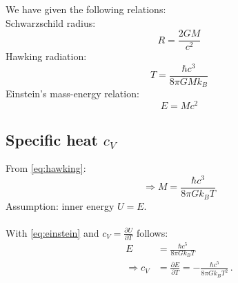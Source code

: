 We have given the following relations: \\
Schwarzschild radius:
\begin{equation}
    R=\frac{2GM}{c^2}
    \label{eq:schwarzschild}
\end{equation}
Hawking radiation:
\begin{equation}
    T=\frac{\hbar c^3}{8\pi GMk_B}
    \label{eq:hawking}
\end{equation}
Einstein's mass-energy relation:
\begin{equation}
    E=Mc^2
    \label{eq:einstein}
\end{equation}

\subsection{Specific heat $c_V$}
    From \eqref{eq:hawking}:
    \begin{equation}
        \Rightarrow M=\frac{\hbar c^3}{8\pi Gk_BT}
    \end{equation}
    Assumption: inner energy $U=E$. \\
    \\
    With \eqref{eq:einstein} and $c_V=\frac{\partial U}{\partial T}$ follows:
    \begin{align}
        E&=\frac{\hbar c^5}{8\pi Gk_BT} \\
        \Rightarrow c_V&=\frac{\partial E}{\partial T}
        =-\frac{\hbar c^5}{8\pi Gk_BT^2} \,.
    \end{align}

